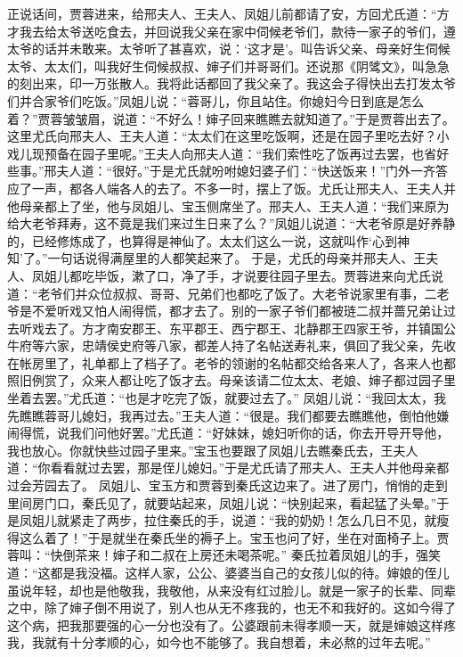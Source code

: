 \documentclass[12pt,oneside]{book}
\begin{document}
正说话间，贾蓉进来，给邢夫人、王夫人、凤姐儿前都请了安，方回尤氏道：“方才我去给太爷送吃食去，并回说我父亲在家中伺候老爷们，款待一家子的爷们，遵太爷的话并未敢来。太爷听了甚喜欢，说：‘这才是’。叫告诉父亲、母亲好生伺候太爷、太太们，叫我好生伺候叔叔、婶子们并哥哥们。还说那《阴骘文》，叫急急的刻出来，印一万张散人。我将此话都回了我父亲了。我这会子得快出去打发太爷们并合家爷们吃饭。”凤姐儿说：“蓉哥儿，你且站住。你媳妇今日到底是怎么着？”贾蓉皱皱眉，说道：“不好么！婶子回来瞧瞧去就知道了。”于是贾蓉出去了。
这里尤氏向邢夫人、王夫人道：“太太们在这里吃饭啊，还是在园子里吃去好？小戏儿现预备在园子里呢。”王夫人向邢夫人道：“我们索性吃了饭再过去罢，也省好些事。”邢夫人道：“很好。”于是尤氏就吩咐媳妇婆子们：“快送饭来！”门外一齐答应了一声，都各人端各人的去了。不多一时，摆上了饭。尤氏让邢夫人、王夫人并他母亲都上了坐，他与凤姐儿、宝玉侧席坐了。邢夫人、王夫人道：“我们来原为给大老爷拜寿，这不竟是我们来过生日来了么？”凤姐儿说道：“大老爷原是好养静的，已经修炼成了，也算得是神仙了。太太们这么一说，这就叫作‘心到神知’了。”一句话说得满屋里的人都笑起来了。
于是，尤氏的母亲并邢夫人、王夫人、凤姐儿都吃毕饭，漱了口，净了手，才说要往园子里去。贾蓉进来向尤氏说道：“老爷们并众位叔叔、哥哥、兄弟们也都吃了饭了。大老爷说家里有事，二老爷是不爱听戏又怕人闹得慌，都才去了。别的一家子爷们都被琏二叔并蔷兄弟让过去听戏去了。方才南安郡王、东平郡王、西宁郡王、北静郡王四家王爷，并镇国公牛府等六家，忠靖侯史府等八家，都差人持了名帖送寿礼来，俱回了我父亲，先收在帐房里了，礼单都上了档子了。老爷的领谢的名帖都交给各来人了，各来人也都照旧例赏了，众来人都让吃了饭才去。母亲该请二位太太、老娘、婶子都过园子里坐着去罢。”尤氏道：“也是才吃完了饭，就要过去了。”
凤姐儿说：“我回太太，我先瞧瞧蓉哥儿媳妇，我再过去。”王夫人道：“很是。我们都要去瞧瞧他，倒怕他嫌闹得慌，说我们问他好罢。”尤氏道：“好妹妹，媳妇听你的话，你去开导开导他，我也放心。你就快些过园子里来。”宝玉也要跟了凤姐儿去瞧秦氏去，王夫人道：“你看看就过去罢，那是侄儿媳妇。”于是尤氏请了邢夫人、王夫人并他母亲都过会芳园去了。
凤姐儿、宝玉方和贾蓉到秦氏这边来了。进了房门，悄悄的走到里间房门口，秦氏见了，就要站起来，凤姐儿说：“快别起来，看起猛了头晕。”于是凤姐儿就紧走了两步，拉住秦氏的手，说道：“我的奶奶！怎么几日不见，就瘦得这么着了！”于是就坐在秦氏坐的褥子上。宝玉也问了好，坐在对面椅子上。贾蓉叫：“快倒茶来！婶子和二叔在上房还未喝茶呢。”
秦氏拉着凤姐儿的手，强笑道：“这都是我没福。这样人家，公公、婆婆当自己的女孩儿似的待。婶娘的侄儿虽说年轻，却也是他敬我，我敬他，从来没有红过脸儿。就是一家子的长辈、同辈之中，除了婶子倒不用说了，别人也从无不疼我的，也无不和我好的。这如今得了这个病，把我那要强的心一分也没有了。公婆跟前未得孝顺一天，就是婶娘这样疼我，我就有十分孝顺的心，如今也不能够了。我自想着，未必熬的过年去呢。”
\end{document}
